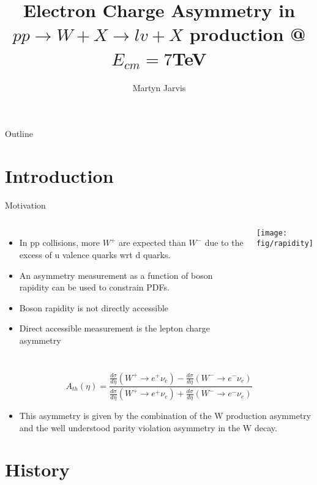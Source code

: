 \documentclass[t, 8pt]{beamer}
\author{Martyn Jarvis}
\title[Electron Charge Asymmetry]{Electron Charge Asymmetry in $pp \to W+X \to
lv + X$ production @ $E_{cm} = 7$TeV}
\begin{document}
\begin{frame}
  \titlepage
\end{frame}

\begin{frame}{Outline}
  \tableofcontents
\end{frame}

\section{Introduction}

\begin{frame}{Motivation}
  \begin{columns}[c]
  \begin{itemize}
    \item In pp collisions, more $W^+$ are expected than $W^-$ due to the excess of u valence quarks wrt d quarks.
    \item An asymmetry measurement as a function of boson rapidity can be used to constrain PDFs.
    \item Boson rapidity is not directly accessible
    \item Direct accessible measurement is the lepton charge asymmetry
  \end{itemize}
    \texttt{[image: fig/rapidity]}
  \end{columns}

    \begin{equation}
    A_{th}(\eta) = \frac{\frac{d\sigma}{d\eta}(W^{+}\to e^{+}\nu_{e}) - \frac{d\sigma}{d\eta}(W^{-}\to e^{-}\nu_{e})}
                        {\frac{d\sigma}{d\eta}(W^{+}\to e^{+}\nu_{e}) + \frac{d\sigma}{d\eta}(W^{-}\to e^{-}\nu_{e})}
    \end{equation}
  \begin{itemize}
    \item This asymmetry is given by the combination of the W production asymmetry and the well understood parity violation asymmetry in the W decay.
  \end{itemize}
\end{frame}

\section{History}
\end{document}
